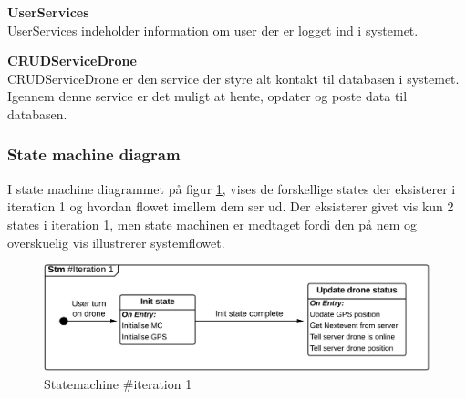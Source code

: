 \textbf{UserServices}\\
UserServices indeholder information om user der er logget ind i systemet.

\textbf{CRUDServiceDrone} \\
CRUDServiceDrone er den service der styre alt kontakt til databasen i systemet. Igennem denne service er det muligt at hente, opdater og poste data til databasen.


\subsubsection*{State machine diagram}
\vspace{-0.1cm}
I state machine diagrammet på figur \ref{fig:Statemachine_iteration1}, vises de forskellige states der eksisterer i iteration 1 og hvordan flowet imellem dem ser ud. Der eksisterer givet vis kun 2 states i iteration 1, men state machinen er medtaget fordi den på nem og overskuelig vis illustrerer systemflowet.
\begin{figure}[H]
	\centering
	\includegraphics[width=1\textwidth]{Billeder/statemachine/State_iteration1.png}
	\vspace{-0.5cm}
	\caption{Statemachine \#iteration 1}
	\label{fig:Statemachine_iteration1}
\end{figure}